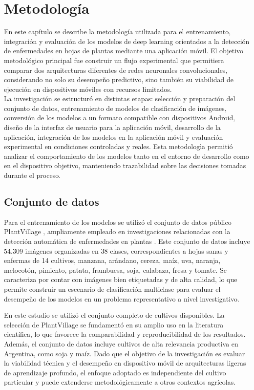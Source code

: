 \chapter{Metodología}


En este capítulo se describe la metodología utilizada para el entrenamiento, integración y evaluación de los modelos 
de deep learning orientados a la detección de enfermedades en hojas de plantas mediante una aplicación móvil.
El objetivo metodológico principal fue construir un flujo experimental que permitiera comparar dos arquitecturas diferentes 
de redes neuronales convolucionales, considerando no solo su desempeño predictivo, sino también su viabilidad de ejecución
en dispositivos móviles con recursos limitados. \\
La investigación se estructuró en distintas etapas: selección y preparación del conjunto de datos, 
entrenamiento de modelos de clasificación de imágenes, conversión de los modelos a un formato compatible con dispositivos Android, 
diseño de la interfaz de usuario para la aplicación móvil, desarrollo de la aplicación, integración de los modelos en la aplicación
móvil y evaluación experimental en condiciones controladas y reales. Esta metodologìa permitió analizar el comportamiento de los
modelos tanto en el entorno de desarrollo como en el dispositivo objetivo, manteniendo trazabilidad sobre las decisiones tomadas 
durante el proceso.



\section{Conjunto de datos}

Para el entrenamiento de los modelos se utilizó el conjunto de datos público PlantVillage \cite{DBLP:journals/corr/HughesS15},
ampliamente empleado en investigaciones relacionadas con la detección automática de enfermedades en plantas \cite{ahmed2021mobile, jasim2020plant, tembhurne2023plant24, subramaniam2026comparative}. Este conjunto de datos
incluye 54.309 imágenes organizadas en 38 clases, correspondientes a hojas sanas y enfermas de 14 cultivos, manzana, arándano, cereza,
maíz, uva, naranja, melocotón, pimiento, patata, frambuesa, soja, calabaza, fresa y tomate. Se caracteriza por contar
con imágenes bien etiquetadas y de alta calidad, lo que permite construir un escenario de clasificación multiclase para evaluar el
desempeño de los modelos en un problema representativo a nivel investigativo.

En este estudio se utilizó el conjunto completo de cultivos disponibles. La selección de PlantVillage se fundamentó en su amplio uso
en la literatura científica, lo que favorece la comparabilidad y reproducibilidad de los resultados. Además, el conjunto de datos
incluye cultivos de alta relevancia productiva en Argentina, como soja y maíz. Dado que el objetivo de la investigación es evaluar la
viabilidad técnica y el desempeño en dispositivo móvil de arquitecturas ligeras de aprendizaje profundo, el enfoque adoptado es
independiente del cultivo particular y puede extenderse metodológicamente a otros contextos agrícolas.

